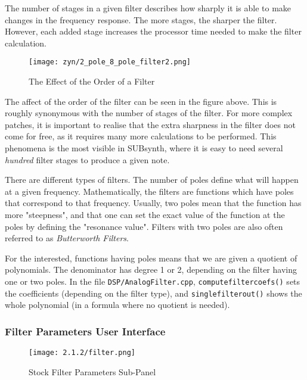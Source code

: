    The number of stages in a given filter describes how sharply it is able to
   make changes in the frequency response.
   The more stages, the sharper the filter.
   However, each added stage increases the processor time needed to make the
   filter calculation.

\begin{figure}[H]
   \centering
   \texttt{[image: zyn/2\_pole\_8\_pole\_filter2.png]}
   \caption[2 Pole vs. 8 Pole Filter]{The Effect of the Order of a Filter}
   \label{fig:2_pole_vs_8_pole_filter}
\end{figure}

   The affect of the order of the filter can be seen in the figure above.
   This is roughly synonymous with the number of stages of the filter. For
   more complex patches, it is important to realise that the extra sharpness
   in the filter does not come for free, as it requires many more
   calculations to be performed. This phenomena is the most visible in
   SUBsynth, where it is easy to need several \textsl{hundred} filter stages
   to produce a given note.

   There are different types of filters. The number of poles define what will
   happen at a given frequency. Mathematically, the filters are functions which
   have poles that correspond to that frequency. Usually, two poles mean that
   the function has more "steepness", and that one can set the exact value of
   the function at the poles by defining the "resonance value". Filters with
   two poles are also often referred to as \textsl{Butterworth Filters}.

   For the interested, functions having poles means that we are given a
   quotient of polynomials. The denominator has degree 1 or 2, depending on the
   filter having one or two poles. In the file \texttt{DSP/AnalogFilter.cpp},
   \texttt{computefiltercoefs()} sets the coefficients
   (depending on the filter type), and
   \texttt{singlefilterout()} shows
   the whole polynomial (in a formula where no quotient is needed).

\subsubsection{Filter Parameters User Interface}
\label{subsubsec:filter_parameters_user_interface}

\begin{figure}[H]
   \centering
   \texttt{[image: 2.1.2/filter.png]}
   \caption[Filter Parameters Sub-panel]{Stock Filter Parameters Sub-Panel}
   \label{fig:filter_parameters_subpanel}
\end{figure}

